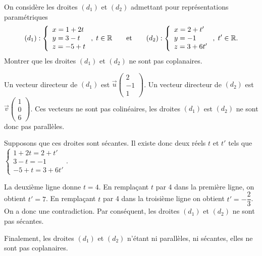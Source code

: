 \documentclass[11pt,fleqn, openany]{book} %
\begin{document}
\begin{exercise}[topic=geo04]
On considère les droites $(d_1)$ et $(d_2)$ admettant pour représentations paramétriques
 \[ (d_1) : \left\{\renewcommand{\arraystretch}{1}\begin{array}{l} x = 1 +2t \\ y = 3-t \\ z = -5+t

\end{array}\right. ,\; t\in \mathbb{R} \qquad \text{et}\qquad  (d_2) : \left\{\renewcommand{\arraystretch}{1}\begin{array}{l} x = 2+t' \\ y = -1 \\ z = 3+6t' 

\end{array}\right. ,\; t'\in \mathbb{R}.\] 
Montrer que les droites $(d_1)$ et $(d_2)$ ne sont pas coplanaires.
\end{exercise}

\begin{solution}Un vecteur directeur de $(d_1)$ est $\vec u \begin{pmatrix}2\\-1\\1\end{pmatrix}$. Un vecteur directeur de $(d_2)$ est $\vec v \begin{pmatrix}1\\0\\6\end{pmatrix}$. Ces vecteurs ne sont pas colinéaires, les droites $(d_1)$ est $(d_2)$ ne sont donc pas parallèles.

Supposons que ces droites sont sécantes. Il existe donc deux réels $t$ et $t'$ tels que $\left\{\begin{array}{l} 1 +2t =2+t' \\  3-t =-1\\ -5+t=3+6t'\end{array}\right.$.

La deuxième ligne donne $t=4$. En remplaçant $t$ par 4 dans la première ligne, on obtient $t'=7$. En remplaçant $t$ par 4 dans la troisième ligne on obtient $t'=-\dfrac{2}{3}$. On a donc une contradiction. Par conséquent, les droites $(d_1)$ et $(d_2)$ ne sont pas sécantes.

Finalement, les droites $(d_1)$ et $(d_2)$ n'étant ni parallèles, ni sécantes, elles ne sont pas coplanaires.\end{solution}
\end{document}
